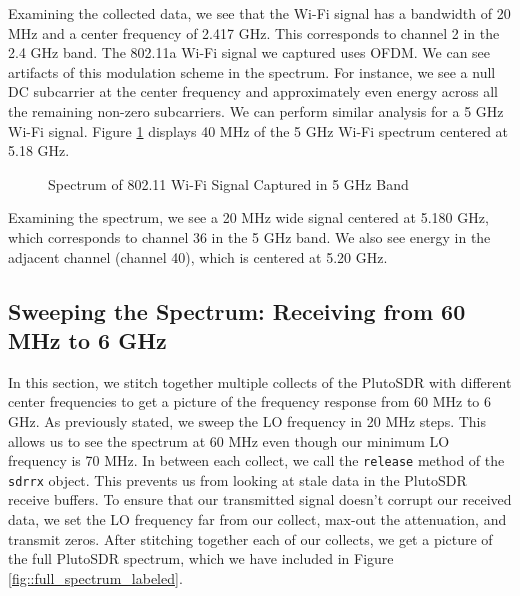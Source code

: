 \documentclass{article}
\begin{document}
Examining the collected data, we see that the Wi-Fi signal has a bandwidth of 20 MHz and a center frequency of 2.417 GHz. This corresponds to channel 2 in the 2.4 GHz band. The 802.11a Wi-Fi signal we captured uses OFDM. We can see artifacts of this modulation scheme in the spectrum. For instance, we see a null DC subcarrier at the center frequency and approximately even energy across all the remaining non-zero subcarriers. We can perform similar analysis for a 5 GHz Wi-Fi signal. Figure \ref{fig::5_180g_wifi_spectrum} displays 40 MHz of the 5 GHz Wi-Fi spectrum centered at 5.18 GHz.

\begin{figure}[H]
	\centerline{}
	\caption{Spectrum of 802.11 Wi-Fi Signal Captured in 5 GHz Band}
	\label{fig::5_180g_wifi_spectrum}
\end{figure}

Examining the spectrum, we see a 20 MHz wide signal centered at 5.180 GHz, which corresponds to channel 36 in the 5 GHz band. We also see energy in the adjacent channel (channel 40), which is centered at 5.20 GHz.

\subsection{Sweeping the Spectrum: Receiving from 60 MHz to 6 GHz}

In this section, we stitch together multiple collects of the PlutoSDR with different center frequencies to get a picture of the frequency response from 60 MHz to 6 GHz. As previously stated, we sweep the LO frequency in 20 MHz steps. This allows us to see the spectrum at 60 MHz even though our minimum LO frequency is 70 MHz. In between each collect, we call the \texttt{release} method of the \texttt{sdrrx} object. This prevents us from looking at stale data in the PlutoSDR receive buffers. To ensure that our transmitted signal doesn't corrupt our received data, we set the LO frequency far from our collect, max-out the attenuation, and transmit zeros. After stitching together each of our collects, we get a picture of the full PlutoSDR spectrum, which we have included in Figure \ref{fig::full_spectrum_labeled}.
\end{document}
